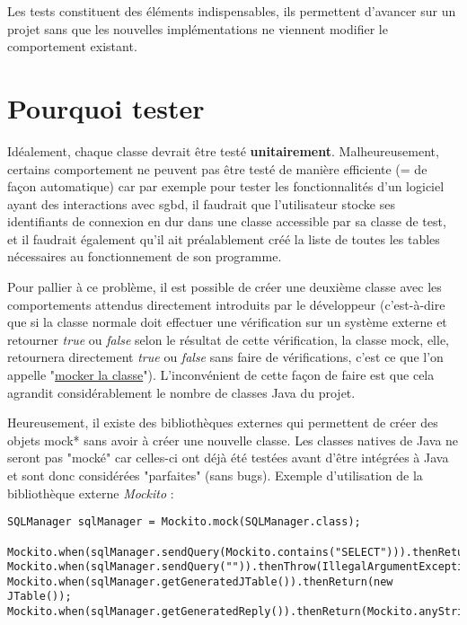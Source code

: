 Les tests constituent des éléments indispensables, ils permettent d'avancer sur un projet sans que les nouvelles implémentations ne viennent modifier le comportement existant.
\section{Pourquoi tester}

Idéalement, chaque classe devrait être testé \textbf{unitairement}.
Malheureusement, certains comportement ne peuvent pas être testé de manière efficiente (= de façon automatique) car par exemple pour tester les fonctionnalités d'un logiciel ayant des interactions avec \gls{sgbd}, il faudrait que l'utilisateur stocke ses identifiants de connexion en dur dans une classe accessible par sa classe de test, et il faudrait également qu'il ait préalablement créé la liste de toutes les tables nécessaires au fonctionnement de son programme.
\bigbreak

Pour pallier à ce problème, il est possible de créer une deuxième classe avec les comportements attendus directement introduits par le développeur (c'est-à-dire que si la classe normale doit effectuer une vérification sur un système externe et retourner \textit{true} ou \textit{false} selon le résultat de cette vérification, la classe mock, elle, retournera directement \textit{true} ou \textit{false} sans faire de vérifications, c'est ce que l'on appelle "\underline{mocker la classe}"). L'inconvénient de cette façon de faire est que cela agrandit considérablement le nombre de classes Java du projet.

\bigbreak
  Heureusement, il existe des bibliothèques externes qui permettent de créer des objets \gls{mock}* sans avoir à créer une nouvelle classe.
Les classes natives de Java ne seront pas "mocké" car celles-ci ont déjà été testées avant d'être intégrées à Java et sont donc considérées "parfaites" (sans bugs).
\bigbreak
Exemple d'utilisation de la bibliothèque externe \textit{Mockito} :

\begin{lstlisting}
SQLManager sqlManager = Mockito.mock(SQLManager.class);

Mockito.when(sqlManager.sendQuery(Mockito.contains("SELECT"))).thenReturn(true);
Mockito.when(sqlManager.sendQuery("")).thenThrow(IllegalArgumentException.class);
Mockito.when(sqlManager.getGeneratedJTable()).thenReturn(new JTable());
Mockito.when(sqlManager.getGeneratedReply()).thenReturn(Mockito.anyString());

\end{lstlisting}
\bigbreak

